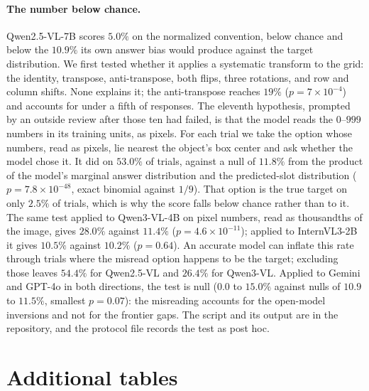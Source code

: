 \documentclass{article}
\begin{document}
\paragraph{The number below chance.} Qwen2.5-VL-7B scores $5.0\%$ on the
normalized convention, below chance and below the $10.9\%$ its own answer bias
would produce against the target distribution. We first tested whether it applies
a systematic transform to the grid: the identity, transpose, anti-transpose, both
flips, three rotations, and row and column shifts. None explains it; the
anti-transpose reaches $19\%$ ($p=7\times10^{-4}$) and accounts for under a fifth
of responses. The eleventh hypothesis, prompted by an outside review after those
ten had failed, is that the model reads the $0$--$999$ numbers in its training
units, as pixels. For each trial we take the option whose numbers, read as pixels,
lie nearest the object's box center and ask whether the model chose it. It did on
$53.0\%$ of trials, against a null of $11.8\%$ from the product of the model's
marginal answer distribution and the predicted-slot distribution ($p=7.8\times
10^{-48}$, exact binomial against $1/9$). That option is the true target on only
$2.5\%$ of trials, which is why the score falls below chance rather than to it.
The same test applied to Qwen3-VL-4B on pixel numbers, read as thousandths of the
image, gives $28.0\%$ against $11.4\%$ ($p=4.6\times10^{-11}$); applied to
InternVL3-2B it gives $10.5\%$ against $10.2\%$ ($p=0.64$). An accurate model
can inflate this rate through trials where the misread option happens to be the
target; excluding those leaves $54.4\%$ for Qwen2.5-VL and $26.4\%$ for Qwen3-VL.
Applied to Gemini and GPT-4o in both directions, the test is null ($0.0$ to
$15.0\%$ against nulls of $10.9$ to $11.5\%$, smallest $p=0.07$): the misreading
accounts for the open-model inversions and not for the frontier gaps. The script
and its output are in the repository, and the protocol file records the test as
post hoc.



\section{Additional tables}
\label{app:tables}
\end{document}

